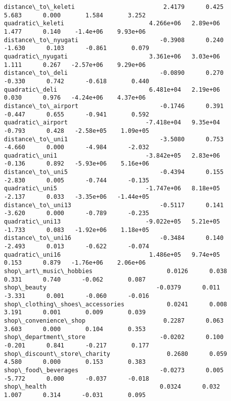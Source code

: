\documentclass[11pt]{article}
\begin{document}
\begin{Verbatim}[commandchars=\\\{\}]
distance\_to\_keleti                         2.4179      0.425      5.683      0.000       1.584       3.252
quadratic\_keleti                        4.266e+06   2.89e+06      1.477      0.140    -1.4e+06    9.93e+06
distance\_to\_nyugati                       -0.3908      0.240     -1.630      0.103      -0.861       0.079
quadratic\_nyugati                       3.361e+06   3.03e+06      1.111      0.267   -2.57e+06    9.29e+06
distance\_to\_deli                          -0.0890      0.270     -0.330      0.742      -0.618       0.440
quadratic\_deli                          6.481e+04   2.19e+06      0.030      0.976   -4.24e+06    4.37e+06
distance\_to\_airport                       -0.1746      0.391     -0.447      0.655      -0.941       0.592
quadratic\_airport                      -7.418e+04   9.35e+04     -0.793      0.428   -2.58e+05    1.09e+05
distance\_to\_uni1                          -3.5080      0.753     -4.660      0.000      -4.984      -2.032
quadratic\_uni1                         -3.842e+05   2.83e+06     -0.136      0.892   -5.93e+06    5.16e+06
distance\_to\_uni5                          -0.4394      0.155     -2.830      0.005      -0.744      -0.135
quadratic\_uni5                         -1.747e+06   8.18e+05     -2.137      0.033   -3.35e+06   -1.44e+05
distance\_to\_uni13                         -0.5117      0.141     -3.620      0.000      -0.789      -0.235
quadratic\_uni13                        -9.022e+05   5.21e+05     -1.733      0.083   -1.92e+06    1.18e+05
distance\_to\_uni16                         -0.3484      0.140     -2.493      0.013      -0.622      -0.074
quadratic\_uni16                         1.486e+05   9.74e+05      0.153      0.879   -1.76e+06    2.06e+06
shop\_art\_music\_hobbies                     0.0126      0.038      0.331      0.740      -0.062       0.087
shop\_beauty                               -0.0379      0.011     -3.331      0.001      -0.060      -0.016
shop\_clothing\_shoes\_accessories            0.0241      0.008      3.191      0.001       0.009       0.039
shop\_convenience\_shop                      0.2287      0.063      3.603      0.000       0.104       0.353
shop\_department\_store                     -0.0202      0.100     -0.201      0.841      -0.217       0.177
shop\_discount\_store\_charity                0.2680      0.059      4.580      0.000       0.153       0.383
shop\_food\_beverages                       -0.0273      0.005     -5.772      0.000      -0.037      -0.018
shop\_health                                0.0324      0.032      1.007      0.314      -0.031       0.095

\end{Verbatim}
\end{document}
